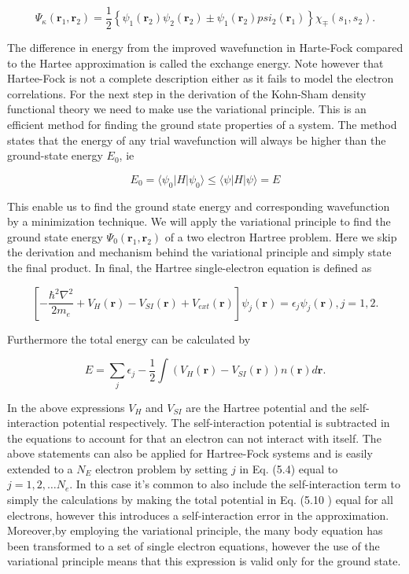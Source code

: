 \begin{equation}
\Psi_{\kappa}(\boldsymbol{r}_1, \boldsymbol{r}_2) = \frac{1}{2} \left\{ \psi_1(\boldsymbol{r}_2) \psi_2(\boldsymbol{r}_2) \pm \psi_1(\boldsymbol{r}_2) psi_2(\boldsymbol{r}_1) \right\} \chi_{\mp}(s_1, s_2).
\end{equation}  

The difference in energy from the improved wavefunction in Harte-Fock compared to the Hartee approximation is called the exchange energy. Note however that Hartee-Fock is not a complete description either as it fails to model the electron correlations. For the next step in the derivation of the Kohn-Sham density functional theory we need to make use the variational principle. This is an efficient method for finding the ground state properties of a system. The method states that the energy of any trial wavefunction will always be higher than the ground-state energy $E_0$, ie

\begin{equation}
    E_0 = \langle\psi_0|H|\psi_0\rangle \leq \langle\psi|H|\psi\rangle = E
\end{equation}

This enable us to find the ground state energy and corresponding wavefunction by a minimization technique. We will apply the variational principle to find the ground state energy $\Psi_0(\boldsymbol{r}_1, \boldsymbol{r}_2)$ of a two electron Hartree problem. Here we skip the derivation and mechanism behind the variational principle and simply state the final product. In final, the Hartree single-electron equation is defined as

\begin{equation}
\left[ -\frac{\hbar^2\nabla^2}{2m_e} + V_H(\boldsymbol{r}) - V_{SI}(\boldsymbol{r}) + V_{ext}(\boldsymbol{r}) \right] \psi_j(\boldsymbol{r}) = \epsilon_j \psi_j(\boldsymbol{r}), j = 1, 2.
\end{equation}
 
Furthermore the total energy can be calculated by
 
\begin{equation}
E = \sum_j \epsilon_j - \frac{1}{2} \int \left( V_H(\boldsymbol{r}) - V_{SI}(\boldsymbol{r}) \right) n(\boldsymbol{r})d\boldsymbol{r}.
\end{equation} 
 
In the above expressions $V_H$ and $V_{SI}$ are the Hartree potential and the self-interaction potential respectively. The self-interaction potential is subtracted in the equations to account for that an electron can not interact with itself. The above statements can also be applied for Hartree-Fock systems and is easily extended to a $N_E$ electron problem by setting $j$ in Eq. (5.4) equal to $j = 1, 2, \dots N_e$. In this case it's common to also include the self-interaction term to simply the calculations by making the total potential in Eq. (5.10 ) equal for all electrons, however this introduces a self-interaction error in the approximation. Moreover,by employing the variational principle, the many body equation has been transformed to a set of single electron equations, however the use of the variational principle means that this expression is valid only for the ground state. 


